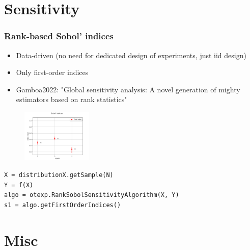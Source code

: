 \documentclass[aspectratio=169]{beamer}
\begin{document}

\section{Sensitivity}

\begin{frame}[containsverbatim]
\frametitle{Rank-based Sobol' indices}

\begin{itemize}
\item Data-driven (no need for dedicated design of experiments, just iid design)
\item Only first-order indices
\item Gamboa2022: "Global sensitivity analysis: A novel generation of mighty estimators based on rank statistics"
\end{itemize}

\begin{figure}
   \includegraphics[width=0.3\textwidth]{figures/sphx_glr_plot_sensitivity_rank_sobol_001}
\end{figure}

\begin{small}
\begin{lstlisting}
X = distributionX.getSample(N)
Y = f(X)
algo = otexp.RankSobolSensitivityAlgorithm(X, Y)
s1 = algo.getFirstOrderIndices()
\end{lstlisting}
\end{small}

\end{frame}


\section{Misc}
\end{document}

